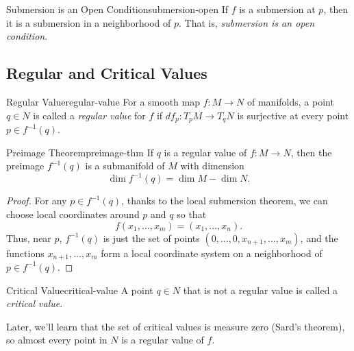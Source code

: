 \begin{corollary}{Submersion is an Open Condition}{submersion-open}
    If $f$ is a submersion at $p$, then it is a submersion in a neighborhood of $p$. That is, \emph{submersion is an open condition}.
\end{corollary}

\subsection{Regular and Critical Values}

\begin{definition}{Regular Value}{regular-value}
    For a smooth map $f \colon M \to N$ of manifolds, a point $q \in N$ is called a \emph{regular value} for $f$ if $df_p \colon T_p M \to T_q N$ is surjective at every point $p \in f^{-1}(q)$.
\end{definition}

\begin{theorem}{Preimage Theorem}{preimage-thm}
    If $q$ is a regular value of $f \colon M \to N$, then the preimage $f^{-1}(q)$ is a submanifold of $M$ with dimension
    \[
        \dim f^{-1}(q) = \dim M - \dim N.
    \]
\end{theorem}

\begin{proof}
    For any $p \in f^{-1}(q)$, thanks to the local submersion theorem, we can choose local coordinates around $p$ and $q$ so that
    \[
        f(x_1, \ldots, x_m) = (x_1, \ldots, x_n).
    \]
    Thus, near $p$, $f^{-1}(q)$ is just the set of points $(0, \ldots, 0, x_{n+1}, \ldots, x_m)$, and the functions $x_{n+1}, \ldots, x_m$ form a local coordinate system on a neighborhood of $p \in f^{-1}(q)$.
\end{proof}

\begin{definition}{Critical Value}{critical-value}
    A point $q \in N$ that is not a regular value is called a \emph{critical value}.
\end{definition}

Later, we'll learn that the set of critical values is measure zero (Sard's theorem), so almost every point in $N$ is a regular value of $f$.

